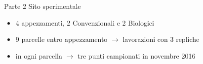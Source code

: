 \documentclass[xcolor={usenames, table, x11names}, final, 10pt]{beamer}
\begin{document}
\begin{frame}{Parte 2 \small{Sito sperimentale}}
  \begin{overlayarea}{\textwidth}{0.20\textheight}  
    \begin{itemize}[<+->]
    \item 4 appezzamenti, 2 Convenzionali e 2 Biologici
    \item 9 parcelle entro appezzamento $\rightarrow$ lavorazioni con 3 repliche
    \item in ogni parcella $\rightarrow$ tre punti campionati in novembre 2016
    \end{itemize}
  \end{overlayarea}
  \begin{overlayarea}{\textwidth}{0.60\textheight}
\end{overlayarea}
\end{frame}
\end{document}
